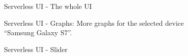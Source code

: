 \begin{figure}[H]
  \centering
  \caption{Serverless UI - The whole UI}
  \label{fig:ui}
\end{figure}

\begin{figure}[H]
  \centering
  \caption{Serverless UI - Graphs: More graphs for the selected device “Samsung Galaxy S7”.}
\end{figure}

\begin{figure}[H]
  \centering
  \caption{Serverless UI - Slider}
  \label{fig:ui-slider}
\end{figure}
